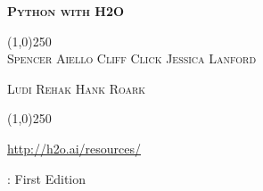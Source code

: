 







\thispagestyle{empty} %


\begin{center}
\textsc{\Large\bf{Python with H2O}}

\bigskip
\line(1,0){250}  %
\\
\bigskip
\small
\textsc{Spencer Aiello \hspace{10pt} Cliff Click \hspace{10pt} Jessica Lanford \hspace{10pt} }

\textsc{Ludi Rehak \hspace{10pt} Hank Roark}

\normalsize

\line(1,0){250}  %

{\url{http://h2o.ai/resources/}}

\bigskip

\monthname \hspace{1pt}  \the\year: First Edition 

\bigskip
\end{center}


\newpage
\restoregeometry

\null\vfill %

\thispagestyle{empty}%

